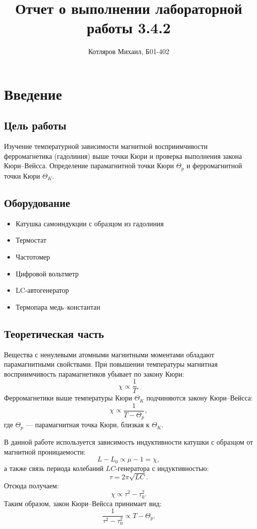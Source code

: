 \documentclass[a4paper]{article}
\title{\textbf{Отчет о выполнении лабораторной работы 3.4.2}}
\date{}
\author{Котляров Михаил, Б01-402}
\begin{document}
\maketitle
	
\section*{Введение}

\subsection*{Цель работы}
Изучение температурной зависимости магнитной восприимчивости ферромагнетика (гадолиния) выше точки Кюри и проверка выполнения закона Кюри–Вейсса. Определение парамагнитной точки Кюри $\Theta_p$ и ферромагнитной точки Кюри $\Theta_K$.

\subsection*{Оборудование}
\begin{itemize}
    \item Катушка самоиндукции с образцом из гадолиния
    \item Термостат
    \item Частотомер
    \item Цифровой вольтметр
    \item LC-автогенератор
    \item Термопара медь–константан
\end{itemize}

\subsection*{Теоретическая часть}
Вещества с ненулевыми атомными магнитными моментами обладают парамагнитными свойствами. При повышении температуры магнитная восприимчивость парамагнетиков убывает по закону Кюри:
\[
\chi \propto \frac{1}{T}.
\]
Ферромагнетики выше температуры Кюри $\Theta_K$ подчиняются закону Кюри–Вейсса:
\[
\chi \propto \frac{1}{T - \Theta_p},
\]
где $\Theta_p$ — парамагнитная точка Кюри, близкая к $\Theta_K$.

В данной работе используется зависимость индуктивности катушки с образцом от магнитной проницаемости:
\[
L - L_0 \propto \mu - 1 = \chi,
\]
а также связь периода колебаний $LC$-генератора с индуктивностью:
\[
\tau = 2\pi \sqrt{LC}.
\]
Отсюда получаем:
\[
\chi \propto \tau^2 - \tau_0^2.
\]
Таким образом, закон Кюри–Вейсса принимает вид:
\[
\frac{1}{\tau^2 - \tau_0^2} \propto T - \Theta_p.
\]
\end{document}

